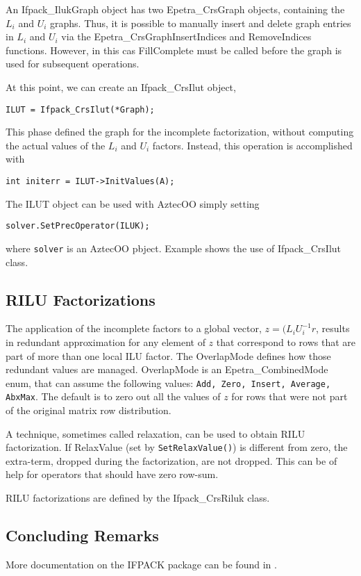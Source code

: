 \begin{remark}
  An Ifpack\_IlukGraph object has two Epetra\_CrsGraph objects,
  containing the $L_i$ and $U_i$ graphs. Thus, it is possible to
  manually insert and delete graph entries in $L_i$ and $U_i$ via the
  Epetra\_CrsGraphInsertIndices and RemoveIndices functions. However, in
  this cas FillComplete must be called before the graph is used for
  subsequent operations.
\end{remark}

At this point, we can create an Ifpack\_CrsIlut object,
\begin{verbatim}
ILUT = Ifpack_CrsIlut(*Graph);
\end{verbatim}
This phase defined the graph for the incomplete factorization, without
computing the actual values of the $L_i$ and $U_i$ factors. Instead,
this operation is accomplished with
\begin{verbatim}
int initerr = ILUT->InitValues(A);
\end{verbatim}
The ILUT object can be used with AztecOO simply setting
\begin{verbatim}
solver.SetPrecOperator(ILUK);
\end{verbatim}
where \verb!solver! is an AztecOO pbject.
\smallskip
Example  shows the use of Ifpack\_CrsIlut class.


\subsection{RILU  Factorizations}
\label{sec:ifpack_rilu}

The application of the incomplete factors to a global vector, $z =
(L_iU_i^{-1} r$, results in redundant approximation for any element of
$z$ that correspond to rows that are part of more than one local ILU
factor. The OverlapMode defines how those redundant values are
managed. OverlapMode is an Epetra\_CombinedMode enum, that can assume
the following values: {\tt Add, Zero, Insert, Average, AbxMax}. The
default is to zero out all the values of $z$ for rows that were not part
of the original matrix row distribution.

A technique, sometimes called relaxation, can be used to obtain RILU
factorization. If RelaxValue (set by \verb!SetRelaxValue()!) is
different from zero, the extra-term, dropped during the factorization,
are not dropped. This can be of help for operators that should have zero
row-sum. 

RILU factorizations are defined by the Ifpack\_CrsRiluk class.



\subsection{Concluding Remarks}
\label{sec:ifpack_concluding}

More documentation on the IFPACK package can be found in
\cite{Ifpack-Ref-Guide,Ifpack-User-Guide}.


